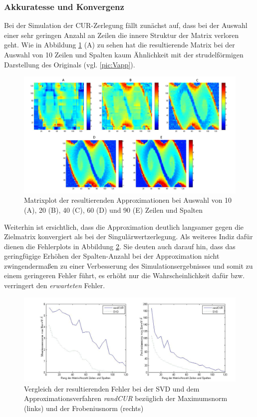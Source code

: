 \documentclass[12pt,a4paper,twoside]{article}
\begin{document}
	\subsubsection*{Akkuratesse und Konvergenz}
	Bei der Simulation der CUR-Zerlegung fällt zunächst auf, dass bei der Auswahl einer sehr geringen Anzahl an 
	Zeilen die innere Struktur der Matrix verloren geht. Wie in Abbildung \ref{pic:randCUR} (A) zu sehen hat die 
	resultierende Matrix bei der Auswahl von 10 Zeilen und Spalten kaum Ähnlichkeit mit der strudelförmigen Darstellung des Originals (vgl. \ref{pic:Vapp}).
	\begin{figure}[h]
		\center
		\includegraphics[scale=0.4]{randCUR_plots3.png}
		\caption{\label{pic:randCUR}Matrixplot der resultierenden Approximationen bei Auswahl von 10 (A), 20 (B), 40 (C), 60 (D) und 90 
		(E) Zeilen und Spalten}
	\end{figure} 
	Weiterhin ist ersichtlich, dass die Approximation deutlich langsamer gegen die Zielmatrix konvergiert als bei der 
	Singulärwertzerlegung. Als weiteres Indiz dafür dienen die Fehlerplots in Abbildung \ref{pic:randCUR_graph}. Sie 
	deuten auch darauf hin, dass das geringfügige Erhöhen der Spalten-Anzahl bei der Approximation nicht 
	zwingendermaßen zu einer Verbesserung des Simulationsergebnisses und somit zu einem geringeren Fehler führt, es 
	erhöht nur die Wahrscheinlichkeit dafür bzw. verringert den \textit{erwarteten} Fehler.
	\begin{figure}[h]
		\center
		\includegraphics[scale=0.4]{randCUR_graphen}
		\caption{\label{pic:randCUR_graph}Vergleich der resultierenden Fehler bei der SVD und dem  Approximationsverfahren \textit{randCUR} bezüglich der Maximumsnorm (links) und der Frobeniusnorm (rechts)}
	\end{figure}
\newpage
\end{document}
